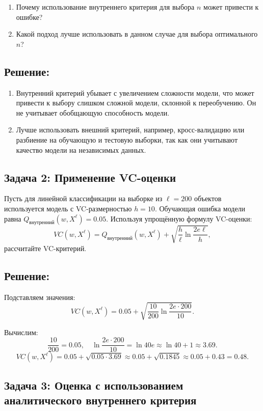 \begin{enumerate}
    \item Почему использование внутреннего критерия для выбора $n$ может привести к ошибке?
    \item Какой подход лучше использовать в данном случае для выбора оптимального $n$?
\end{enumerate}

\subsection*{Решение:}

\begin{enumerate}
    \item Внутренний критерий убывает с увеличением сложности модели, что может привести к выбору слишком сложной модели, склонной к переобучению. Он не учитывает обобщающую способность модели.
    \item Лучше использовать внешний критерий, например, кросс-валидацию или разбиение на обучающую и тестовую выборки, так как они учитывают качество модели на независимых данных.
\end{enumerate}


\subsection*{Задача 2: Применение VC-оценки}

Пусть для линейной классификации на выборке из $\ell = 200$ объектов используется модель с VC-размерностью $h = 10$. Обучающая ошибка модели равна $Q_{\text{внутренний}}(w, X^\ell) = 0.05$. Используя упрощённую формулу VC-оценки:
\[
VC(w, X^\ell) = Q_{\text{внутренний}}(w, X^\ell) + \sqrt{\frac{h}{\ell} \ln \frac{2e\ell}{h}},
\]
рассчитайте VC-критерий.

\subsection*{Решение:}

Подставляем значения:
\[
VC(w, X^\ell) = 0.05 + \sqrt{\frac{10}{200} \ln \frac{2e \cdot 200}{10}}.
\]

Вычислим:
\[
\frac{10}{200} = 0.05, \quad \ln \frac{2e \cdot 200}{10} = \ln 40e \approx \ln 40 + 1 \approx 3.69.
\]
\[
VC(w, X^\ell) = 0.05 + \sqrt{0.05 \cdot 3.69} \approx 0.05 + \sqrt{0.1845} \approx 0.05 + 0.43 = 0.48.
\]


\subsection*{Задача 3: Оценка с использованием аналитического внутреннего критерия}

